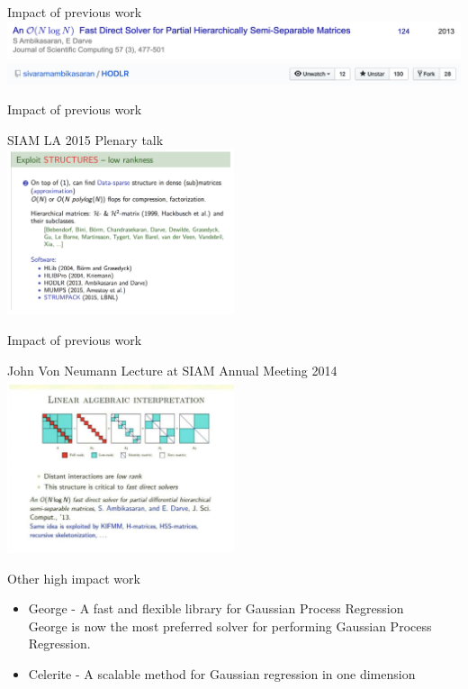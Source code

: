 \documentclass{beamer}
\begin{document}
\begin{frame}{Impact of previous work}
	\includegraphics[width=\textwidth]{./images/HODLR_paper.png}\\
	\includegraphics[width=\textwidth]{./images/HODLR_Code.png}
\end{frame}

\begin{frame}{Impact of previous work}
	\begin{center}
	SIAM LA 2015 Plenary talk\\
	\includegraphics[width=0.5\textwidth]{./images/SIAMLA2015Plenary.png}
	\end{center}
\end{frame}

\begin{frame}{Impact of previous work}
	\begin{center}
	John Von Neumann Lecture at SIAM Annual Meeting 2014\\
	\includegraphics[width=0.5\textwidth]{./images/SIAMVonNeumann2014.png}
	\end{center}
\end{frame}

\begin{frame}{Other high impact work}
	\begin{itemize}
		\item
		George - A fast and flexible library for Gaussian Process Regression\\
		George is now the most preferred solver for performing Gaussian Process Regression.
		\item
		Celerite - A scalable method for Gaussian regression in one dimension
	\end{itemize}
\end{frame}
\end{document}
